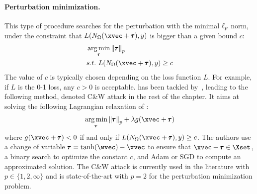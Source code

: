\paragraph{Perturbation minimization.}
This type of procedure searches for the perturbation with the minimal $\ell_p $ norm, under the constraint that $L(\nn_\weights(\xvec + \adv), y)$ is bigger than a given bound $c$:
\begin{align}
  &\argmin_{\adv} \norm{\adv}_p \label{equation:ch2-normmin} \\
  &\st\ L(\nn_\weights(\xvec + \adv), y) \geq c \notag
\end{align}
The value of $c$ is typically chosen depending on the loss function $L$.
For example, if $L$ is the 0-1 loss, any $c > 0$ is acceptable.
 has been tackled by~\citet{carlini2017towards}, leading to the following method, denoted C\&W attack in the rest of the chapter.
It aims at solving the following Lagrangian relaxation of :
\begin{equation}
  \argmin_{\adv} \norm{\adv}_p + \lambda g(\xvec+\adv)
\end{equation}
where $g(\xvec + \adv)<0$ if and only if $L(\nn_\weights(\xvec + \adv),y) \geq c$. 
The authors use a change of variable $\adv = \tanh(\wvec) - \xvec$ to ensure that $\xvec + \adv \in \Xset$, a binary search to optimize the constant $c$, and Adam or SGD to compute an approximated solution.
The C\&W attack is currently used in the literature with $p \in \{1, 2, \infty \}$ and is state-of-the-art with $p=2$ for the perturbation minimization problem.





